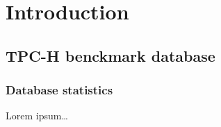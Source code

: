 

\section{Introduction}

\subsection{TPC-H benckmark database}

\subsubsection{Database statistics}

Lorem ipsum\dots
